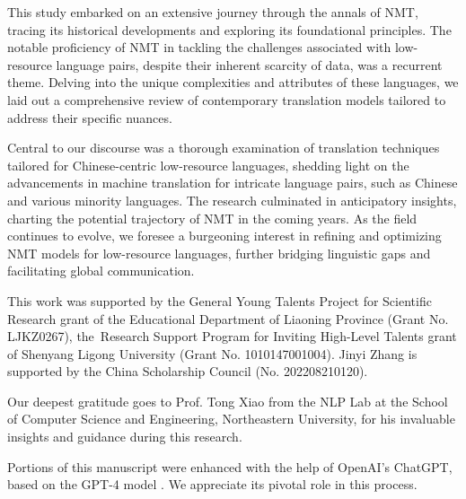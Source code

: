 \documentclass[acmsmall]{acmart}
\begin{document}
This study embarked on an extensive journey through the annals of NMT, tracing its historical developments and exploring its foundational principles. The notable proficiency of NMT in tackling the challenges associated with low-resource language pairs, despite their inherent scarcity of data, was a recurrent theme. Delving into the unique complexities and attributes of these languages, we laid out a comprehensive review of contemporary translation models tailored to address their specific nuances. 

Central to our discourse was a thorough examination of translation techniques tailored for Chinese-centric low-resource languages, shedding light on the advancements in machine translation for intricate language pairs, such as Chinese and various minority languages. The research culminated in anticipatory insights, charting the potential trajectory of NMT in the coming years. As the field continues to evolve, we foresee a burgeoning interest in refining and optimizing NMT models for low-resource languages, further bridging linguistic gaps and facilitating global communication.




\begin{acks}

This work was supported by the General Young Talents Project for Scientific Research grant of the Educational Department of Liaoning Province (Grant No. LJKZ0267), the~Research Support Program for Inviting High-Level Talents grant of Shenyang Ligong University (Grant No. 1010147001004). Jinyi Zhang is supported by the China Scholarship Council (No. 202208210120).

Our deepest gratitude goes to Prof. Tong Xiao from the NLP Lab at the School of Computer Science and Engineering, Northeastern University, for his invaluable insights and guidance during this research.

Portions of this manuscript were enhanced with the help of OpenAI's ChatGPT, based on the GPT-4 model \cite{OpenAI01}. We appreciate its pivotal role in this process.

\end{acks}
\end{document}
